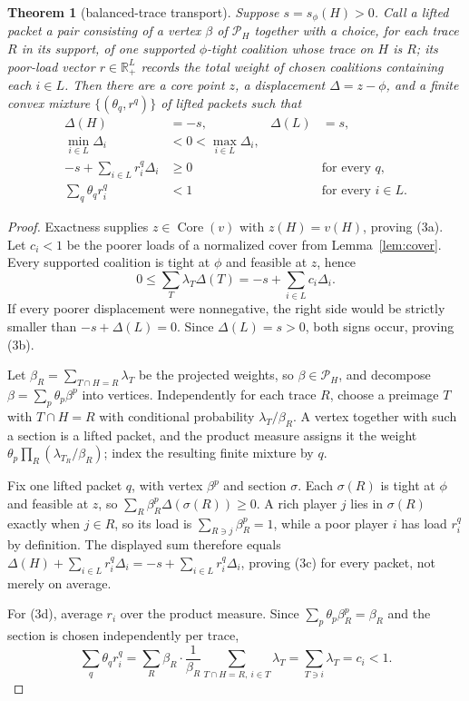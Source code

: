 \documentclass[11pt]{article}
\newtheorem{theorem}{Theorem}
\newcommand{\core}{\operatorname{Core}}
\begin{document}
\begin{theorem}[balanced-trace transport]\label{thm:transport}
Suppose $s=s_\phi(H)>0$.  Call a \emph{lifted packet} a pair consisting of a
vertex $\beta$ of $\mathcal P_H$ together with a choice, for each trace $R$
in its support, of one supported $\phi$-tight coalition whose trace on $H$ is
$R$; its \emph{poor-load vector} $r\in\mathbb R_+^L$ records the total weight
of chosen coalitions containing each $i\in L$.  Then there are a core point
$z$, a displacement $\Delta=z-\phi$, and a finite convex mixture
$\{(\theta_q,r^q)\}$ of lifted packets such that
\begin{align}
 \Delta(H)&=-s,&\Delta(L)&=s,                                      \tag{3a}\\
 \min_{i\in L}\Delta_i&<0<\max_{i\in L}\Delta_i,                  \tag{3b}\\
 -s+\sum_{i\in L}r_i^q\Delta_i&\ge0&&\text{for every }q,           \tag{3c}\\
 \sum_q\theta_qr_i^q&<1&&\text{for every }i\in L.                 \tag{3d}
\end{align}
\end{theorem}

\begin{proof}
Exactness supplies $z\in\core(v)$ with $z(H)=v(H)$, proving (3a).
Let $c_i<1$ be the poorer loads of a normalized cover from
Lemma~\ref{lem:cover}.  Every supported coalition is tight at $\phi$ and
feasible at $z$, hence
\[
 0\le\sum_T\lambda_T\Delta(T)
   =-s+\sum_{i\in L}c_i\Delta_i.                    \tag{4}
\]
If every poorer displacement were nonnegative, the right side would be
strictly smaller than $-s+\Delta(L)=0$.  Since $\Delta(L)=s>0$, both signs
occur, proving (3b).

Let $\beta_R=\sum_{T\cap H=R}\lambda_T$ be the projected weights, so
$\beta\in\mathcal P_H$, and decompose $\beta=\sum_p\theta_p\beta^p$ into
vertices.  Independently for each trace $R$, choose a preimage $T$ with
$T\cap H=R$ with conditional probability $\lambda_T/\beta_R$.  A vertex
together with such a section is a lifted packet, and the product measure
assigns it the weight $\theta_p\prod_R(\lambda_{T_R}/\beta_R)$; index the
resulting finite mixture by $q$.

Fix one lifted packet $q$, with vertex $\beta^p$ and section $\sigma$.  Each
$\sigma(R)$ is tight at $\phi$ and feasible at $z$, so
$\sum_R\beta^p_R\Delta(\sigma(R))\ge0$.  A rich player $j$ lies in
$\sigma(R)$ exactly when $j\in R$, so its load is
$\sum_{R\ni j}\beta^p_R=1$, while a poor player $i$ has load $r_i^q$ by
definition.  The displayed sum therefore equals
$\Delta(H)+\sum_{i\in L}r_i^q\Delta_i=-s+\sum_{i\in L}r_i^q\Delta_i$,
proving (3c) for every packet, not merely on average.

For (3d), average $r_i$ over the product measure.  Since
$\sum_p\theta_p\beta^p_R=\beta_R$ and the section is chosen independently per
trace,
\[
 \sum_q\theta_qr_i^q
 =\sum_R\beta_R\cdot
   \frac{1}{\beta_R}\!\!\sum_{T\cap H=R,\ i\in T}\!\!\lambda_T
 =\sum_{T\ni i}\lambda_T=c_i<1 .
\]
\end{proof}
\end{document}
